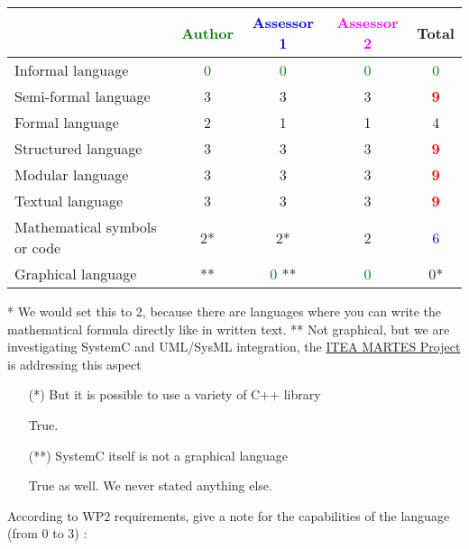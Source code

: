 \begin{tabular}{|l | c | c | c | c|}
\hline
& \textcolor{green}{Author} & \textcolor{blue}{Assessor 1} & \textcolor{magenta}{Assessor 2} & Total \\
\hline
Informal language & \textcolor{green}{0}   & \textcolor{green}{0} & \textcolor{green}{0} & \textcolor{green}{0} \\
\hline
Semi-formal language &3 & 3   & 3    & \textcolor{red}{\textbf{9}} \\
\hline
Formal language &2 &1 & 1    & 4    \\
\hline
Structured language &3 &3 & 3    & \textcolor{red}{\textbf{9}} \\
\hline
Modular language &3 &3 & 3    & \textcolor{red}{\textbf{9}}  \\
\hline
Textual language &3 &3 & 3    & \textcolor{red}{\textbf{9}} \\
\hline
Mathematical symbols or code &2* &2* & 2    & \textcolor{blue}{6} \\
\hline
Graphical language &** & \textcolor{green}{0} **& \textcolor{green}{0} &  0* \\
\hline
\end{tabular}

\begin{author_comment}
* We would set this to 2, because there are languages where you can write the mathematical formula directly like in written text.
** Not graphical, but we are investigating SystemC and UML/SysML integration, the \href{http://www.martes-idea.org/}{ITEA MARTES Project} is addressing this aspect
\end{author_comment}
\begin{assessor1}
\begin{itemize}
\item[(*)] But it is possible to use a variety of C++ library
\begin{author_comment}
True.
\end{author_comment}
\item[(**)] SystemC itself is not a graphical language
\begin{author_comment}
True as well. We never stated anything else.
\end{author_comment}
\end{itemize}
\end{assessor1}

According to WP2 requirements, give a note for the capabilities of the language (from 0 to 3) :


